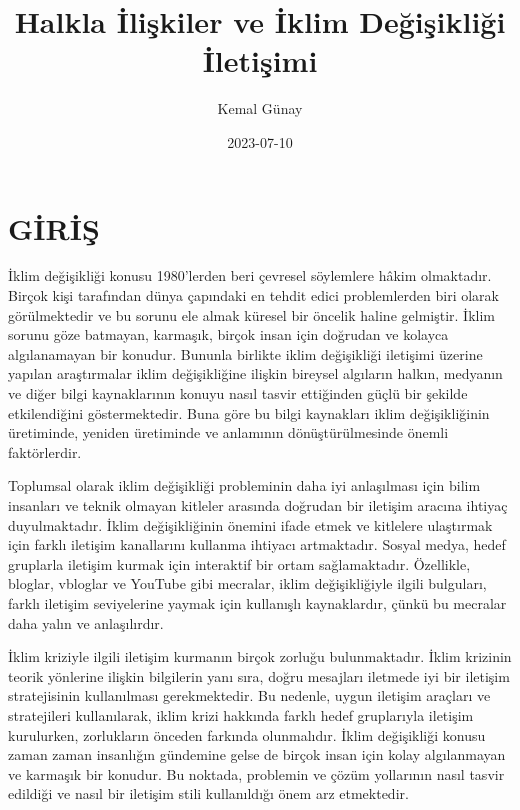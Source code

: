 \documentclass[
]{book}
\title{Halkla İlişkiler ve İklim Değişikliği İletişimi}
\author{Kemal Günay}
\date{2023-07-10}
\begin{document}
\maketitle

{
\setcounter{tocdepth}{1}
\tableofcontents
}
\hypertarget{giriux15f}{%
\chapter*{GİRİŞ}\label{giriux15f}}

İklim değişikliği konusu 1980'lerden beri çevresel söylemlere hâkim olmaktadır. Birçok kişi tarafından dünya çapındaki en tehdit edici problemlerden biri olarak görülmektedir ve bu sorunu ele almak küresel bir öncelik haline gelmiştir. İklim sorunu göze batmayan, karmaşık, birçok insan için doğrudan ve kolayca algılanamayan bir konudur. Bununla birlikte iklim değişikliği iletişimi üzerine yapılan araştırmalar iklim değişikliğine ilişkin bireysel algıların halkın, medyanın ve diğer bilgi kaynaklarının konuyu nasıl tasvir ettiğinden güçlü bir şekilde etkilendiğini göstermektedir. Buna göre bu bilgi kaynakları iklim değişikliğinin üretiminde, yeniden üretiminde ve anlamının dönüştürülmesinde önemli faktörlerdir.\citep{mahl2020bit}

Toplumsal olarak iklim değişikliği probleminin daha iyi anlaşılması için bilim insanları ve teknik olmayan kitleler arasında doğrudan bir iletişim aracına ihtiyaç duyulmaktadır. İklim değişikliğinin önemini ifade etmek ve kitlelere ulaştırmak için farklı iletişim kanallarını kullanma ihtiyacı artmaktadır. Sosyal medya, hedef gruplarla iletişim kurmak için interaktif bir ortam sağlamaktadır. Özellikle, bloglar, vbloglar ve YouTube gibi mecralar, iklim değişikliğiyle ilgili bulguları, farklı iletişim seviyelerine yaymak için kullanışlı kaynaklardır, çünkü bu mecralar daha yalın ve anlaşılırdır. \citep{purath2019blogging}

İklim kriziyle ilgili iletişim kurmanın birçok zorluğu bulunmaktadır. İklim krizinin teorik yönlerine ilişkin bilgilerin yanı sıra, doğru mesajları iletmede iyi bir iletişim stratejisinin kullanılması gerekmektedir. Bu nedenle, uygun iletişim araçları ve stratejileri kullanılarak, iklim krizi hakkında farklı hedef gruplarıyla iletişim kurulurken, zorlukların önceden farkında olunmalıdır. \citep[3]{leal2019overview} İklim değişikliği konusu zaman zaman insanlığın gündemine gelse de birçok insan için kolay algılanmayan ve karmaşık bir konudur. Bu noktada, problemin ve çözüm yollarının nasıl tasvir edildiği ve nasıl bir iletişim stili kullanıldığı önem arz etmektedir.
\end{document}
